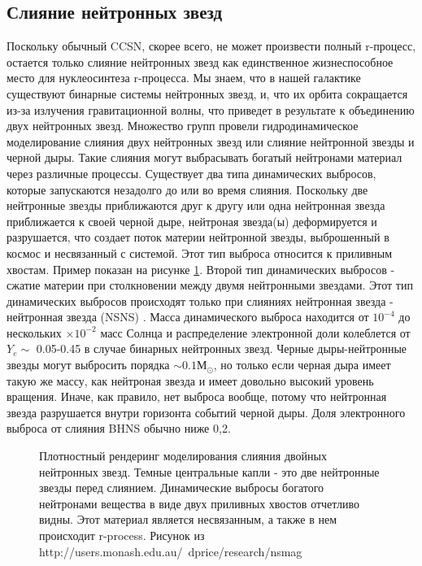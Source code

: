 \documentclass[%
master,    %
natbib,      %
subf,        %
href,        %
colorlinks,  %
]{disser}
\begin{document}
\subsection{Слияние нейтронных звезд}

Поскольку обычный CCSN, скорее всего, не может произвести полный r-процесс, остается только слияние нейтронных звезд как единственное жизнеспособное место для нуклеосинтеза r-процесса. Мы знаем, что в нашей галактике существуют бинарные системы нейтронных звезд, и, что их орбита сокращается из-за излучения гравитационной волны, что приведет в результате к объединению двух нейтронных звезд. Множество групп провели гидродинамическое моделирование слияния двух нейтронных звезд или слияние нейтронной звезды и черной дыры. Такие слияния могут выбрасывать богатый нейтронами материал через различные процессы. Существует два типа динамических выбросов, которые запускаются незадолго до или во время слияния. Поскольку две нейтронные звезды приближаются друг к другу или одна нейтронная звезда приближается к своей черной дыре, нейтроная звезда(ы) деформируется и разрушается, что создает поток материи нейтронной звезды, выброшенный в космос и несвязанный с системой. Этот тип выброса относится к приливным хвостам. Пример показан на рисунке \ref{ris:11}. Второй тип динамических выбросов - сжатие материи при столкновении между двумя нейтронными звездами. Этот тип динамических выбросов происходят только при слияниях нейтронная звезда - нейтронная звезда (NSNS) \cite{nsns}. Масса динамического выброса находится от $10^{-4}$ до нескольких $\times 10^{-2}$ масс Солнца и распределение электронной доли колеблется от $Y_e \sim$ 0.05-0.45 в случае бинарных нейтронных звезд. Черные дыры-нейтронные звезды могут выбросить порядка $\sim 0.1 М_\odot$, но только если черная дыра имеет такую же массу, как нейтроная звезда и имеет довольно высокий уровень вращения. Иначе, как правило, нет выброса вообще, потому что нейтронная звезда разрушается внутри горизонта событий черной дыры. Доля электронного выброса от слияния BHNS обычно ниже 0,2.

\begin{figure}[h]
	\caption{Плотностный рендеринг моделирования слияния двойных нейтронных звезд. Темные центральные капли - это две нейтронные звезды перед слиянием. Динамические выбросы богатого нейтронами вещества в виде двух приливных хвостов отчетливо видны. Этот материал является несвязанным, а также в нем происходит r-process. Рисунок из http://users.monash.edu.au/~dprice/research/nsmag}
	\label{ris:11}
\end{figure}
\end{document}
